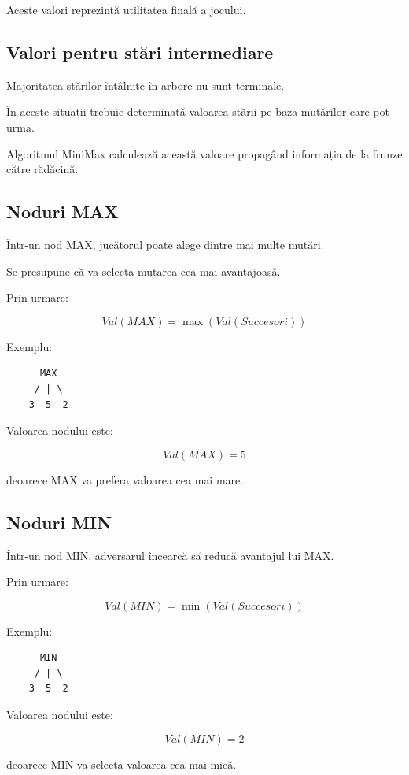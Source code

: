 \documentclass[12pt,a4paper]{article}
\begin{document}
Aceste valori reprezintă utilitatea finală a jocului.

\subsection{Valori pentru stări intermediare}

Majoritatea stărilor întâlnite în arbore nu sunt terminale.

În aceste situații trebuie determinată valoarea stării pe baza mutărilor care pot urma.

Algoritmul MiniMax calculează această valoare propagând informația de la frunze către rădăcină.

\subsection{Noduri MAX}

Într-un nod MAX, jucătorul poate alege dintre mai multe mutări.

Se presupune că va selecta mutarea cea mai avantajoasă.

Prin urmare:

\[
Val(MAX)=\max(Val(Succesori))
\]

Exemplu:

\begin{verbatim}
      MAX
     / | \
    3  5  2
\end{verbatim}

Valoarea nodului este:

\[
Val(MAX)=5
\]

deoarece MAX va prefera valoarea cea mai mare.

\subsection{Noduri MIN}

Într-un nod MIN, adversarul încearcă să reducă avantajul lui MAX.

Prin urmare:

\[
Val(MIN)=\min(Val(Succesori))
\]

Exemplu:

\begin{verbatim}
      MIN
     / | \
    3  5  2
\end{verbatim}

Valoarea nodului este:

\[
Val(MIN)=2
\]

deoarece MIN va selecta valoarea cea mai mică.
\end{document}
